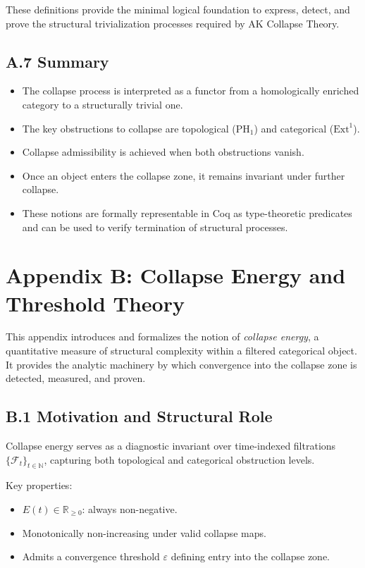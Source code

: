 \documentclass[11pt]{article}
\begin{document}
These definitions provide the minimal logical foundation to express, detect, and prove the structural trivialization processes required by AK Collapse Theory.

\subsection*{A.7 Summary}

\begin{itemize}
  \item The collapse process is interpreted as a functor from a homologically enriched category to a structurally trivial one.
  \item The key obstructions to collapse are topological (\( \mathrm{PH}_1 \)) and categorical (\( \mathrm{Ext}^1 \)).
  \item Collapse admissibility is achieved when both obstructions vanish.
  \item Once an object enters the collapse zone, it remains invariant under further collapse.
  \item These notions are formally representable in Coq as type-theoretic predicates and can be used to verify termination of structural processes.
\end{itemize}



\appendix
\section*{Appendix B: Collapse Energy and Threshold Theory}

This appendix introduces and formalizes the notion of \emph{collapse energy}, a quantitative measure of structural complexity within a filtered categorical object. It provides the analytic machinery by which convergence into the collapse zone is detected, measured, and proven.

\subsection*{B.1 Motivation and Structural Role}

Collapse energy serves as a diagnostic invariant over time-indexed filtrations \( \{ \mathcal{F}_t \}_{t \in \mathbb{N}} \), capturing both topological and categorical obstruction levels.

Key properties:
\begin{itemize}
  \item \( E(t) \in \mathbb{R}_{\geq 0} \): always non-negative.
  \item Monotonically non-increasing under valid collapse maps.
  \item Admits a convergence threshold \( \varepsilon \) defining entry into the collapse zone.
\end{itemize}
\end{document}
